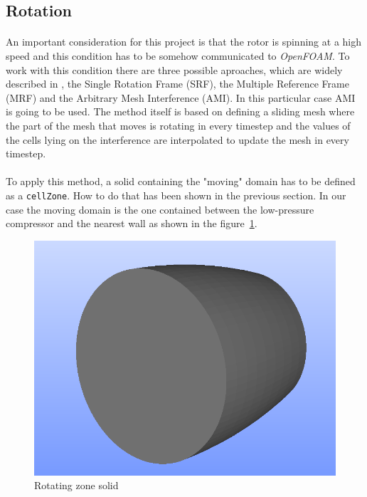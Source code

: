 \subsection{Rotation}
\paragraph{}An important consideration for this project is that the rotor is spinning at a high speed and this condition has to be somehow communicated to \textit{OpenFOAM}. To work with this condition there are three possible aproaches, which are widely described in \cite{Nozaki9240}, the Single Rotation Frame (SRF), the Multiple Reference Frame (MRF) and the Arbitrary Mesh Interference (AMI). In this particular case AMI is going to be used. The method itself is based on defining a sliding mesh where the part of the mesh that moves is rotating in every timestep and the values of the cells lying on the interference are interpolated to update the mesh in every timestep. 

\paragraph{}To apply this method, a solid containing the "moving" domain has to be defined as a \texttt{cellZone}. How to do that has been shown in the previous section. In our case the moving domain is the one contained between the low-pressure compressor and the nearest wall as shown in the figure~\ref{AMI}. 

\begin{figure}[h!]
\centering
\includegraphics[scale=0.45]{./img/AMI.png}
\caption{Rotating zone solid}
\label{AMI}
\end{figure}

